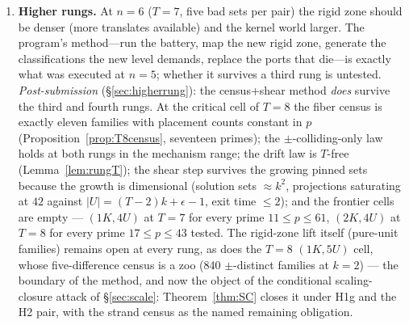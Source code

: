 \documentclass[11pt,a4paper]{article}
\numberwithin{equation}{section}
\theoremstyle{plain}
\theoremstyle{definition}
\theoremstyle{remark}
\begin{document}
\begin{enumerate}[leftmargin=1.7em,itemsep=4pt]
\item \textbf{Higher rungs.} At $n=6$ ($T=7$, five bad sets per pair) the
  rigid zone should be denser (more translates available) and the kernel
  world larger. The program's method---run the battery, map the new
  rigid zone, generate the classifications the new level demands, replace
  the ports that die---is exactly what was executed at $n=5$; whether it
  survives a third rung is untested. \emph{Post-submission}
  (\S\ref{sec:higherrung}): the census+shear method \emph{does} survive
  the third and fourth rungs. At the critical cell of $T=8$ the fiber
  census is exactly eleven families with placement counts constant in
  $p$ (Proposition~\ref{prop:T8census}, seventeen primes); the
  $\pm$-colliding-only law holds at both rungs in the mechanism range;
  the drift law is $T$-free (Lemma~\ref{lem:rungT}); the shear step
  survives the growing pinned sets because the growth is dimensional
  (solution sets $\approx k^2$, projections saturating at $42$ against
  $|U|=(T-2)k+\epsilon-1$, exit time $\le2$); and the frontier cells are
  empty --- $(1K,4U)$ at $T=7$ for every prime $11\le p\le61$, $(2K,4U)$
  at $T=8$ for every prime $17\le p\le43$ tested. The rigid-zone lift
  itself (pure-unit families) remains open at every rung, as does the
  $T=8$ $(1K,5U)$ cell, whose five-difference census is a zoo (840
  $\pm$-distinct families at $k=2$) --- the boundary of the method,
  and now the object of the conditional scaling-closure attack of
  \S\ref{sec:scale}: Theorem~\ref{thm:SC} closes it under H1g and the
  H2 pair, with the strand census as the named remaining obligation.


\end{enumerate}
\end{document}
